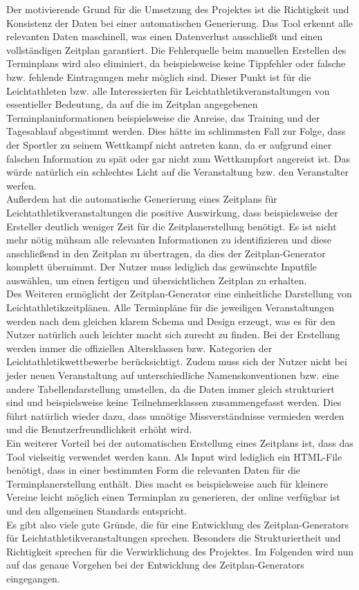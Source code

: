 Der motivierende Grund für die Umsetzung des Projektes ist die Richtigkeit und Konsistenz der Daten bei einer automatischen Generierung. Das Tool erkennt alle relevanten Daten maschinell, was einen Datenverlust ausschließt und einen vollständigen Zeitplan garantiert. Die Fehlerquelle beim manuellen Erstellen des Terminplans wird also eliminiert, da beispielsweise keine Tippfehler oder falsche bzw. fehlende Eintragungen mehr möglich sind. Dieser Punkt ist für die Leichtathleten bzw. alle Interessierten für Leichtathletikveranstaltungen von essentieller Bedeutung, da auf die im Zeitplan angegebenen Terminplaninformationen beispielsweise die Anreise, das Training und der Tagesablauf abgestimmt werden. Dies hätte im schlimmsten Fall zur Folge, dass der Sportler zu seinem Wettkampf nicht antreten kann, da er aufgrund einer falschen Information zu spät oder gar nicht zum Wettkampfort angereist ist. Das würde natürlich ein schlechtes Licht auf die Veranstaltung bzw. den Veranstalter werfen.\\
Außerdem hat die automatische Generierung eines Zeitplans für Leichtathletikveranstaltungen die positive Auswirkung, dass beispielsweise der Ersteller deutlich weniger Zeit für die Zeitplanerstellung benötigt. Es ist nicht mehr nötig mühsam alle relevanten Informationen zu identifizieren und diese anschließend in den Zeitplan zu übertragen, da dies der Zeitplan-Generator komplett übernimmt. Der Nutzer muss lediglich das gewünschte Inputfile auswählen, um einen fertigen und übersichtlichen Zeitplan zu erhalten. \\
Des Weiteren ermöglicht der Zeitplan-Generator eine einheitliche Darstellung von Leichtathletikzeitplänen. Alle Terminpläne für die jeweiligen Veranstaltungen werden nach dem gleichen klarem Schema und Design erzeugt, was es für den Nutzer natürlich auch leichter macht sich zurecht zu finden. Bei der Erstellung werden immer die offiziellen Altersklassen bzw. Kategorien der Leichtathletikwettbewerbe berücksichtigt. Zudem muss sich der Nutzer nicht bei jeder neuen Veranstaltung auf unterschiedliche Namenskonventionen bzw. eine andere Tabellendarstellung umstellen, da die Daten immer gleich strukturiert sind und beispielsweise keine Teilnehmerklassen zusammengefasst werden. Dies führt natürlich wieder dazu, dass unnötige Missverständnisse vermieden werden und die Benutzerfreundlichkeit erhöht wird.\\
Ein weiterer Vorteil bei der automatischen Erstellung eines Zeitplans ist, dass das Tool vielseitig verwendet werden kann. Als Input wird lediglich ein HTML-File benötigt, dass in einer bestimmten Form die relevanten Daten für die Terminplanerstellung enthält. Dies macht es beispielsweise auch für kleinere Vereine leicht möglich einen Terminplan zu generieren, der online verfügbar ist und den allgemeinen Standards entspricht.\\
Es gibt also viele gute Gründe, die für eine Entwicklung des Zeitplan-Generators für Leichtathletikveranstaltungen sprechen. Besonders die Strukturiertheit und Richtigkeit sprechen für die Verwirklichung des Projektes. Im Folgenden wird nun auf das genaue Vorgehen bei der Entwicklung des Zeitplan-Generators eingegangen.




